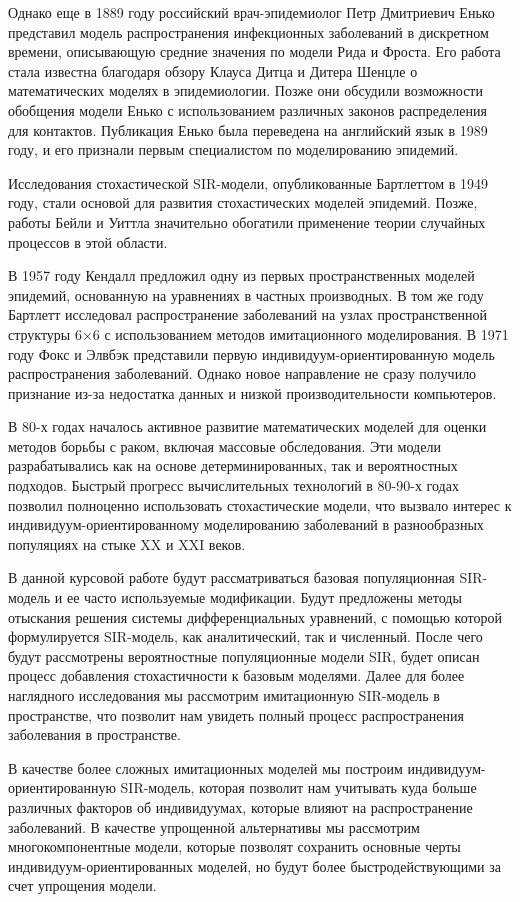 \documentclass[a4paper, 14pt]{extreport}
\begin{document}
	Однако еще в 1889 году российский врач-эпидемиолог Петр Дмитриевич Енько представил модель распространения инфекционных заболеваний в дискретном времени, описывающую средние значения по модели Рида и Фроста. Его работа стала известна благодаря обзору Клауса Дитца и Дитера Шенцле о математических моделях в эпидемиологии. Позже они обсудили возможности обобщения модели Енько с использованием различных законов распределения для контактов. Публикация Енько была переведена на английский язык в 1989 году, и его признали первым специалистом по моделированию эпидемий.
	
	Исследования стохастической SIR-модели, опубликованные Бартлеттом в 1949 году, стали основой для развития стохастических моделей эпидемий. Позже, работы Бейли и Уиттла значительно обогатили применение теории случайных процессов в этой области.
	
	В 1957 году Кендалл предложил одну из первых пространственных моделей эпидемий, основанную на уравнениях в частных производных. В том же году Бартлетт исследовал распространение заболеваний на узлах пространственной структуры 6×6 с использованием методов имитационного моделирования. В 1971 году Фокс и Элвбэк представили первую индивидуум-ориентированную модель распространения заболеваний. Однако новое направление не сразу получило признание из-за недостатка данных и низкой производительности компьютеров.
	
	В 80-х годах началось активное развитие математических моделей для оценки методов борьбы с раком, включая массовые обследования. Эти модели разрабатывались как на основе детерминированных, так и вероятностных подходов. Быстрый прогресс вычислительных технологий в 80-90-х годах позволил полноценно использовать стохастические модели, что вызвало интерес к индивидуум-ориентированному моделированию заболеваний в разнообразных популяциях на стыке XX и XXI веков.
	
	В данной курсовой работе будут рассматриваться базовая популяционная SIR-модель и ее часто используемые модификации. Будут предложены методы отыскания решения системы дифференциальных уравнений, с помощью которой формулируется SIR-модель, как аналитический, так и численный. После чего будут рассмотрены вероятностные популяционные модели SIR, будет описан процесс добавления стохастичности к базовым моделями. Далее для более наглядного исследования мы рассмотрим имитационную SIR-модель в пространстве, что позволит нам увидеть полный процесс распространения заболевания в пространстве. 
	
	В качестве более сложных имитационных моделей мы построим индивидуум-ориентированную SIR-модель, которая позволит нам учитывать куда больше различных факторов об индивидуумах, которые влияют на распространение заболеваний. В качестве упрощенной альтернативы мы рассмотрим многокомпонентные модели, которые позволят сохранить основные черты индивидуум-ориентированных моделей, но будут более быстродействующими за счет упрощения модели.
	
\end{document}
